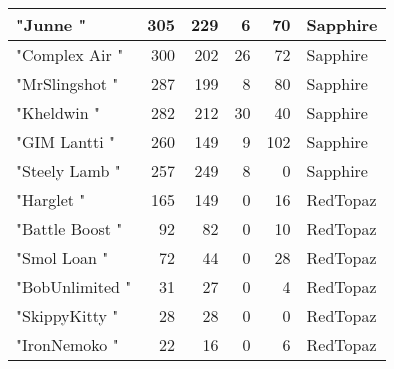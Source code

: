 \documentclass{article}
\begin{document}
\begin{table}[htbp]
\begin{tabular}{|l|r|r|r|r|l|}
"Junne " & 305 & 229 & 6 & 70 & Sapphire \\ \hline
"Complex Air " & 300 & 202 & 26 & 72 & Sapphire \\ \hline
"MrSlingshot " & 287 & 199 & 8 & 80 & Sapphire \\ \hline
"Kheldwin " & 282 & 212 & 30 & 40 & Sapphire \\ \hline
"GIM Lantti " & 260 & 149 & 9 & 102 & Sapphire \\ \hline
"Steely Lamb " & 257 & 249 & 8 & 0 & Sapphire \\ \hline
"Harglet " & 165 & 149 & 0 & 16 & RedTopaz \\ \hline
"Battle Boost " & 92 & 82 & 0 & 10 & RedTopaz \\ \hline
"Smol Loan " & 72 & 44 & 0 & 28 & RedTopaz \\ \hline
"BobUnlimited " & 31 & 27 & 0 & 4 & RedTopaz \\ \hline
"SkippyKitty " & 28 & 28 & 0 & 0 & RedTopaz \\ \hline
"IronNemoko " & 22 & 16 & 0 & 6 & RedTopaz \\ \hline
\end{tabular}
\end{table}
\end{document}
